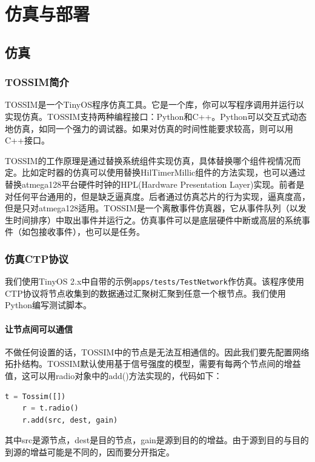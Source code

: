 \chapter{仿真与部署}\label{simulate}

\section{仿真}
\subsection{TOSSIM简介}
TOSSIM是一个TinyOS程序仿真工具。它是一个库，你可以写程序调用并运行以实现仿真。TOSSIM支持两种编程接口：Python和C++。Python可以交互式动态地仿真，如同一个强力的调试器。如果对仿真的时间性能要求较高，则可以用C++接口。

TOSSIM的工作原理是通过替换系统组件实现仿真，具体替换哪个组件视情况而定。比如定时器的仿真可以使用替换HilTimerMillic组件的方法实现，也可以通过替换atmega128平台硬件时钟的HPL(Hardware Presentation Layer)实现。前者是对任何平台通用的，但是缺乏逼真度。后者通过仿真芯片的行为实现，逼真度高，但是只对atmega128适用。TOSSIM是一个离散事件仿真器，它从事件队列（以发生时间排序）中取出事件并运行之。仿真事件可以是底层硬件中断或高层的系统事件（如包接收事件），也可以是任务。

\subsection{仿真CTP协议}
我们使用TinyOS 2.x中自带的示例\texttt{apps/tests/TestNetwork}作仿真。该程序使用CTP协议将节点收集到的数据通过汇聚树汇聚到任意一个根节点。我们使用Python编写测试脚本。
\subsubsection{让节点间可以通信}
不做任何设置的话，TOSSIM中的节点是无法互相通信的。因此我们要先配置网络拓扑结构。TOSSIM默认使用基于信号强度的模型，需要有每两个节点间的增益值，这可以用radio对象中的add()方法实现的，代码如下：

\begin{lstlisting}[language=python,frame=tb]
    t = Tossim([])
    r = t.radio()
    r.add(src, dest, gain)
\end{lstlisting}
其中src是源节点，dest是目的节点，gain是源到目的的增益。由于源到目的与目的到源的增益可能是不同的，因而要分开指定。

